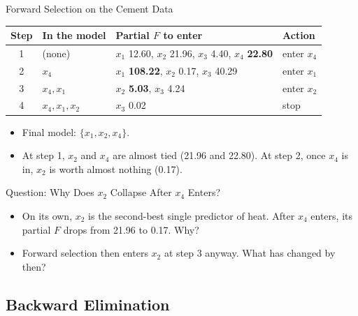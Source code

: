 \begin{frame}{Forward Selection on the Cement Data}
    \begin{center}
        \small
        \begin{tabular}{clll}
            \toprule
            Step & In the model & Partial $F$ to enter & Action \\
            \midrule
            1 & (none) & $x_1$ 12.60, $x_2$ 21.96, $x_3$ 4.40, $x_4$ \textbf{22.80} & enter $x_4$ \\
            2 & $x_4$ & $x_1$ \textbf{108.22}, $x_2$ 0.17, $x_3$ 40.29 & enter $x_1$ \\
            3 & $x_4,x_1$ & $x_2$ \textbf{5.03}, $x_3$ 4.24 & enter $x_2$ \\
            4 & $x_4,x_1,x_2$ & $x_3$ 0.02 & stop \\
            \bottomrule
        \end{tabular}
    \end{center}
    \begin{itemize}
        \item Final model: $\{x_1,x_2,x_4\}$.
        \item At step 1, $x_2$ and $x_4$ are almost tied (21.96 and 22.80). At step 2, once $x_4$ is in, $x_2$ is worth almost nothing (0.17).
    \end{itemize}
\end{frame}


\begin{frame}{Question: Why Does $x_2$ Collapse After $x_4$ Enters?}
    \begin{itemize}
        \item On its own, $x_2$ is the second-best single predictor of heat. After $x_4$ enters, its partial $F$ drops from 21.96 to 0.17. Why?
        \item Forward selection then enters $x_2$ at step 3 anyway. What has changed by then?
    \end{itemize}
\end{frame}


\subsection{Backward Elimination}


